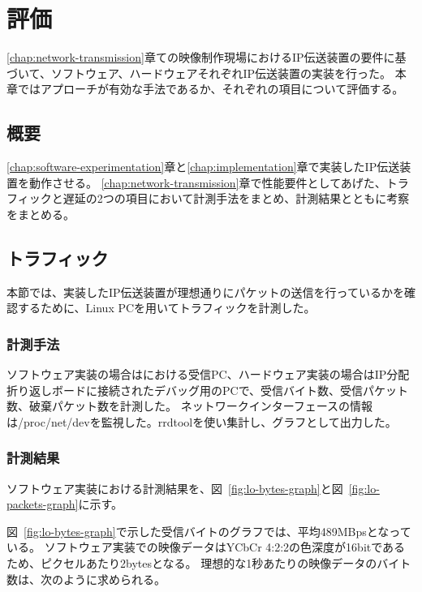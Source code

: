 \chapter{評価}
\label{chap:evaluation}

\ref{chap:network-transmission}章ての映像制作現場におけるIP伝送装置の要件に基づいて、ソフトウェア、ハードウェアそれぞれIP伝送装置の実装を行った。
本章ではアプローチが有効な手法であるか、それぞれの項目について評価する。

\section{概要}

\ref{chap:software-experimentation}章と\ref{chap:implementation}章で実装したIP伝送装置を動作させる。
\ref{chap:network-transmission}章で性能要件としてあげた、トラフィックと遅延の2つの項目において計測手法をまとめ、計測結果とともに考察をまとめる。

\section{トラフィック}

本節では、実装したIP伝送装置が理想通りにパケットの送信を行っているかを確認するために、Linux PCを用いてトラフィックを計測した。

\subsection{計測手法}

ソフトウェア実装の場合はにおける受信PC、ハードウェア実装の場合はIP分配折り返しボードに接続されたデバッグ用のPCで、受信バイト数、受信パケット数、破棄パケット数を計測した。
ネットワークインターフェースの情報は/proc/net/devを監視した。rrdtoolを使い集計し、グラフとして出力した。

\subsection{計測結果}

ソフトウェア実装における計測結果を、図~\ref{fig:lo-bytes-graph}と図~\ref{fig:lo-packets-graph}に示す。

図~\ref{fig:lo-bytes-graph}で示した受信バイトのグラフでは、平均489MBpsとなっている。
ソフトウェア実装での映像データはYCbCr 4:2:2の色深度が16bitであるため、ピクセルあたり2bytesとなる。%
理想的な1秒あたりの映像データのバイト数は、次のように求められる。

